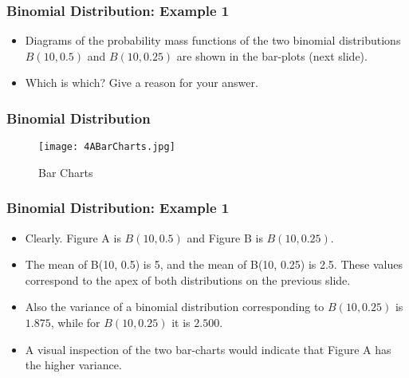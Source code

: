 \begin{frame}
	\frametitle{Binomial Distribution: Example 1}
	\begin{itemize} \item Diagrams of the probability mass functions of the two binomial
		distributions $B(10, 0.5)$ and $B(10, 0.25)$ are shown in the bar-plots (next slide). \item Which
		is which? Give a reason for your answer.
	\end{itemize}
\end{frame}
\begin{frame}
	\frametitle{Binomial Distribution}
	\begin{figure}
		\texttt{[image: 4ABarCharts.jpg]}\\
		\caption{Bar Charts}
	\end{figure}
\end{frame}
\begin{frame}
	\frametitle{Binomial Distribution: Example 1}
	\begin{itemize}
		\item Clearly. Figure A is $B(10, 0.5)$ and Figure B is $B(10, 0.25)$.
		\item The mean of B(10, 0.5) is 5, and the mean of B(10, 0.25) is 2.5. These values correspond to the apex of both distributions on the previous slide.
		\item Also the variance of a binomial distribution corresponding to $B(10, 0.25)$ is $1.875$, while for $B(10, 0.25)$ it is $2.500$.
		\item A visual inspection of the two bar-charts would indicate that Figure A has the higher variance.
	\end{itemize}
\end{frame}
